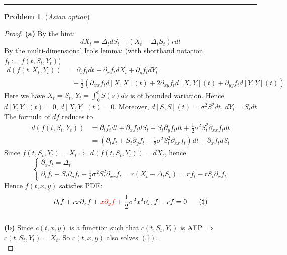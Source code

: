 \documentclass[a4paper, 10pt]{article}
\theoremstyle{definition}
\newtheorem{problem}{Problem}
\theoremstyle{hSol}
\begin{document}
\noindent\rule{16cm}{0.4pt}
\begin{problem} (\textit{Asian option})
\end{problem}
\begin{proof} \textbf{(a)} By the hint:
\begin{equation}
	dX_t = \Delta_t dS_t + (X_t - \Delta_t S_t) rdt
\end{equation}
By the multi-dimensional Ito's lemma: (with shorthand notation $f_t:=f(t,S_t,Y_t)$)
\begin{equation}
	\begin{split}
		d(f(t,X_t,Y_t)) &= \partial_t f_t dt + \partial_x f_t dX_t + \partial_y f_t dY_t \\
		&~~~+\frac{1}{2}\left(\partial_{xx}f_td[X,X](t) + 2\partial_{xy} f_t d[X,Y](t)+\partial_{yy}f_td[Y,Y](t)\right)
	\end{split}
\end{equation}
Here we have $X_t = S_t$, $Y_t = \int_0^t S(s)ds$ is of bounded variation. Hence $d[Y,Y](t)=0$, $d[X,Y](t)=0$. Moreover, $d[S,S](t)=\sigma^2 S^2dt$, $dY_t=S_tdt$ The formula of $df$ reduces to
\begin{equation}
	\begin{split}
		d(f(t,S_t,Y_t)) &= \partial_t f_t dt + \partial_x f_t dS_t + S_t\partial_y f_t dt + \frac{1}{2}\sigma^2 S_t^2 \partial_{xx}f_tdt \\
		&=\left(\partial_t f_t+S_t\partial_y f_t+\frac{1}{2}\sigma^2 S_t^2 \partial_{xx}f_t\right)dt + \partial_x f_t dS_t
	\end{split}
\end{equation}
Since $f(t,S_t,Y_t)=X_t \Rightarrow$ $d(f(t,S_t,Y_t)) = dX_t$, hence
\begin{equation}
	\begin{cases}
	\partial_x f_t = \Delta_t \\
	\partial_t f_t+S_t\partial_y f_t+\frac{1}{2}\sigma^2 S_t^2 \partial_{xx}f_t = r(X_t - \Delta_t S_t) = rf_t -rS_t\partial_x f_t
	\end{cases}
\end{equation}
Hence $f(t,x,y)$ satisfies PDE:
\begin{equation}
	\partial_t f +rx\partial_x f  + \textcolor{red}{x\partial_y f}+\frac{1}{2}\sigma^2 x^2 \partial_{xx}f -  rf = 0 ~~~~~(\ddag)
\end{equation}
~\\
\textbf{(b)} Since $c(t,x,y)$ is a function such that $c(t,S_t,Y_t)$ is AFP $\Rightarrow$ $c(t,S_t,Y_t)=X_t$. So $c(t,x,y)$ also solves $(\ddag)$.  \\

\end{proof}
\end{document}
